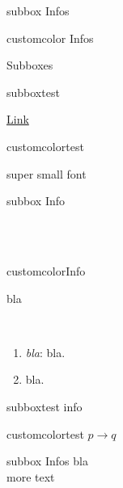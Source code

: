 \documentclass[10pt,a4paper]{article}
\begin{document}
\begin{multicols}{3}
\begin{multibox}{2}
\begin{subbox}{subbox}{ Infos}
\end{subbox}
\begin{subbox}{customcolor}{ Infos}

\end{subbox}
\end{multibox}


\begin{textbox}{Subboxes}
\begin{multibox}{2} %
\begin{subbox}{subbox}{test}

\href{https://latex-ninja.com}{Link}
\end{subbox}
\begin{subbox}{customcolor}{test}
\scriptsize


\tiny
super small font

\end{subbox}
\end{multibox}

\begin{multibox}{2} %
\begin{subbox}{subbox}{ Info}

\\
\\

\end{subbox}
\begin{subbox}{customcolor}{Info}

\end{subbox}
\end{multibox}
\end{textbox}



\begin{textbox}{bla}


\\
\begin{enumerate}
    \item \emph{bla}: bla.
    \item bla.
\end{enumerate}

\begin{multibox}{3} %
\begin{subbox}{subbox}{test}
info
\end{subbox}
\begin{subbox}{customcolor}{test}
$p \to q$
\end{subbox}
\begin{subbox}{subbox}{ Infos}
bla \\
more text
\end{subbox}
\end{multibox}


\end{textbox}
\end{multicols}
\end{document}
